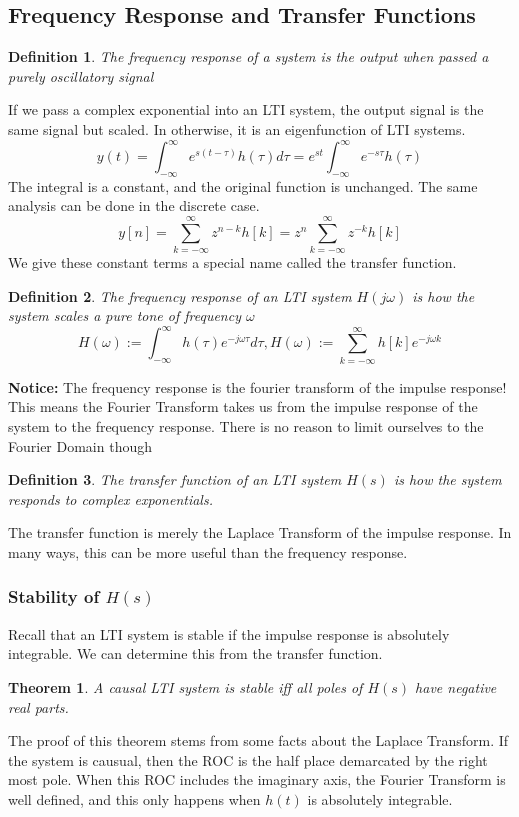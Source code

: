 \documentclass{article}
\newtheorem{theorem}{Theorem}
\newtheorem{definition}{Definition}
\begin{document}
\subsection{Frequency Response and Transfer Functions}
\begin{definition}
    The frequency response of a system is the output when passed a purely oscillatory signal
\end{definition}
If we pass a complex exponential into an LTI system, the output signal is the same signal but scaled.
In otherwise, it is an eigenfunction of LTI systems.
$$y(t)=\int_{-\infty}^{\infty}{e^{s(t-\tau)}h(\tau)d\tau}=e^{st}\int_{-\infty}^{\infty}{e^{-s\tau}h(\tau)}$$
The integral is a constant, and the original function is unchanged.
The same analysis can be done in the discrete case.
$$y[n]=\sum_{k=-\infty}^{\infty}z^{n-k}h[k] = z^n \sum_{k=-\infty}^{\infty}z^{-k}h[k]$$
We give these constant terms a special name called the transfer function.
\begin{definition}
    The frequency response of an LTI system $H(j\omega)$ is how the system scales a pure tone of frequency $\omega$
    $$H(\omega):=\int_{-\infty}^{\infty}{h(\tau)e^{-j\omega\tau}d\tau}, H(\omega):= \sum_{k=-\infty}^{\infty}{h[k]e^{-j\omega k}}$$
\end{definition}
\textbf{Notice: }The frequency response is the fourier transform of the impulse response!
This means the Fourier Transform takes us from the impulse response of the system to the frequency response.
There is no reason to limit ourselves to the Fourier Domain though
\begin{definition}
    The transfer function of an LTI system $H(s)$ is how the system responds to complex exponentials.
\end{definition}
The transfer function is merely the Laplace Transform of the impulse response. In many ways, this can be more useful than the frequency response.
\subsubsection{Stability of $H(s)$}
Recall that an LTI system is stable if the impulse response is absolutely integrable. We can determine this from the transfer function.
\begin{theorem}
    A causal LTI system is stable iff all poles of $H(s)$ have negative real parts.
\end{theorem}
The proof of this theorem stems from some facts about the Laplace Transform. If the system is causual, then the ROC is the half place demarcated by the right most pole.
When this ROC includes the imaginary axis, the Fourier Transform is well defined, and this only happens when $h(t)$ is absolutely integrable.
\end{document}
